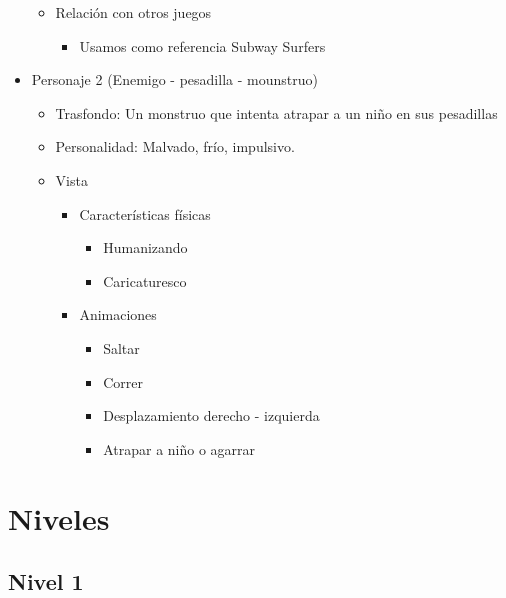 \begin{itemize}
\begin{itemize}
		      \item Relación con otros juegos
		            \begin{itemize}
			            \item Usamos como referencia Subway Surfers
		            \end{itemize}
	      \end{itemize}
	\item Personaje 2 (Enemigo - pesadilla - mounstruo)
	      \begin{itemize}
		      \item Trasfondo: Un monstruo que intenta atrapar a un niño en sus pesadillas
		      \item Personalidad: Malvado, frío, impulsivo.
		      \item Vista
		            \begin{itemize}
			            \item Características físicas
			                  \begin{itemize}
				                  \item Humanizando
				                  \item Caricaturesco
			                  \end{itemize}
			            \item Animaciones
			                  \begin{itemize}
				                  \item Saltar
				                  \item Correr
				                  \item Desplazamiento derecho - izquierda
				                  \item Atrapar a niño o agarrar
			                  \end{itemize}
		            \end{itemize}
	      \end{itemize}
\end{itemize}

\section{Niveles}
\subsection{Nivel 1}
